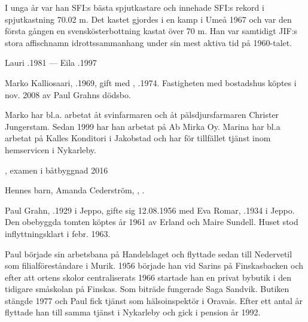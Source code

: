 I unga år var han SFI:s bästa spjutkastare och innehade SFI:s rekord i spjutkastning 70.02 m. Det kastet gjordes i en kamp i Umeå 1967 och var den första gången en svenskösterbottning kastat över 70 m. Han var samtidigt JIF:s stora affischnamn idrottssammanhang under sin mest aktiva tid på 1960-talet.

Lauri .1981  ---  Eila .1997



%



%
Marko Kalliosaari, .1969, gift med , .1974. Fastigheten med bostadshus köptes i nov. 2008 av Paul Grahns dödsbo.

Marko har bl.a. arbetat åt svinfarmaren  och åt pälsdjursfarmaren Christer Jungerstam. Sedan 1999 har han arbetat på Ab Mirka Oy. Marina har bl.a arbetat på Kalles Konditori i Jakobstad  och har för tillfället tjänst inom hemservicen i Nykarleby.
\begin{jhchildren}
  \item {}, examen i båtbyggnad 2016
  \item {}
  \item {}
\end{jhchildren}
Hennes barn, Amanda Cederström, \textborn , .


%
Paul Grahn, .1929 i Jeppo, gifte sig 12.08.1956 med Eva Romar, .1934 i Jeppo. Den obebyggda tomten köptes år 1961 av Erland och Maire Sundell. Huset stod inflyttningsklart i febr. 1963.

Paul började sin arbetsbana på Handelslaget och flyttade sedan till Nedervetil som filialföreståndare i Murik. 1956 började han vid Sarins på Finskasbacken och efter att ortens skolor centraliserats 1966 startade han en privat bybutik i den tidigare småskolan på Finskas. Som biträde fungerade Saga Sandvik. Butiken stängde 1977 och Paul fick tjänst som hälsoinspektör i Oravais. Efter ett antal år flyttade han till samma tjänst i Nykarleby och gick i pension år 1992.

